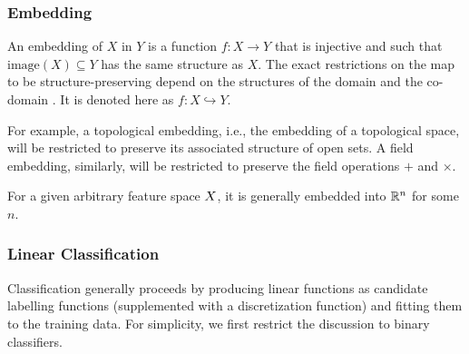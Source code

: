 \subsubsection{Embedding}
An embedding of \(X\) in \(Y\) is a function \(f:X \to Y\) that is injective and
such that \(\text{image}(X) \subseteq Y\) has the same structure as \(X\). The
exact restrictions on the map to be structure-preserving depend on the
structures of the domain and the co-domain \cite{sankappanavar1981course}. It is
denoted here as \(f:X\hookrightarrow Y\).

For example, a topological embedding, i.e., the embedding of a topological
space, will be restricted to preserve its associated structure of open sets. A
field embedding, similarly, will be restricted to preserve the field operations
\(+\) and \(\times\).

For a given arbitrary feature space \(X\), it is generally embedded
into \(\mathbb{R}^n\) for some \(n\).

\subsubsection{Linear Classification}
Classification generally proceeds by producing linear functions as candidate
labelling functions (supplemented with a discretization function) and fitting
them to the training data. For simplicity, we first restrict the discussion to
binary classifiers.


